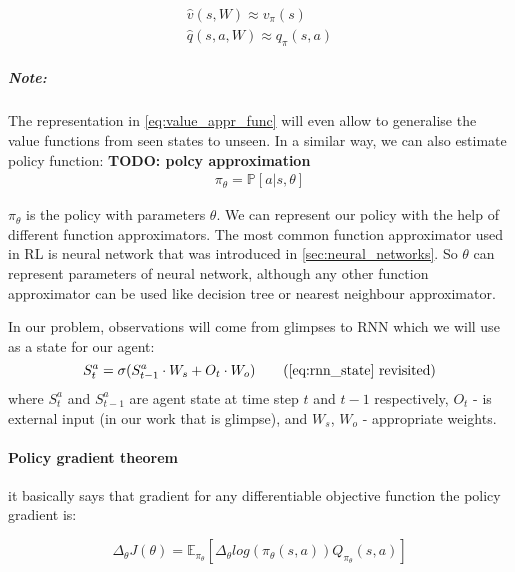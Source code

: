 \begin{align} \label{eq:value_appr_func}
	\hat{v}(s, W) \approx v_{\pi}(s) \\
	\hat{q}(s, a, W) \approx q_{\pi}(s, a)
\end{align}

\subparagraph{Note:}
The representation in \ref{eq:value_appr_func} will even allow to generalise
the value functions from seen states to unseen.
In a similar way, we can also estimate policy function:
\textbf{TODO: polcy approximation}
\begin{align} \label{eq:policy_appr_func}
	\pi_{\theta} = \mathbb{P}[a|s, \theta]
\end{align}


$\pi_{\theta}$ is the policy with parameters $\theta$. We can represent our policy
with the help of different function approximators. The most common function
approximator used in RL is neural network that was introduced in \autoref{sec:neural_networks}.
So $\theta$ can represent parameters of neural network, although any other function approximator
can be used like decision tree or nearest neighbour approximator.


In our problem, observations will come from glimpses to RNN which we will use
as a state for our agent:
\begin{equation} \label{eq:rnn_state}
	S_t^a = \sigma(S_{t-1}^a \cdot W_s + O_t \cdot W_o)	\tag{\ref{eq:rnn_state} revisited}
\end{equation}
where $S_t^a$ and $S_{t-1}^a$ are agent state at time step $t$ and $t-1$
respectively, $O_t$ - is external input (in our work that is glimpse),
and $W_s$, $W_o$ - appropriate weights.




\paragraph{Policy gradient theorem} it basically says that gradient
for any differentiable objective function the policy gradient is:

\begin{equation} \label{eq:reinforce}
	\Delta_{\theta} J(\theta) = \mathbb{E}_{\pi_{\theta}}
		[\Delta_{\theta} log(
		\pi_{\theta}(s, a) )  Q_{\pi_{\theta}}(s, a)]
\end{equation}

